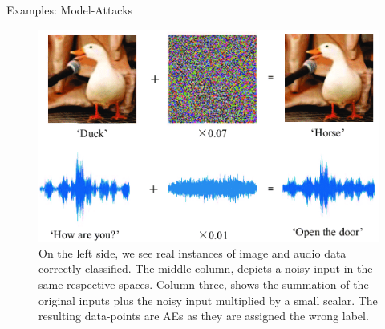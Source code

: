 \documentclass[11pt,compress,t,notes=noshow, xcolor=table]{beamer}
\begin{document}
\begin{vbframe}{Examples: Model-Attacks}
\begin{figure}[h]
\centering
  \includegraphics[width=0.6\linewidth]{slides/local-explanations/figure/AEduckSound.png}
  \caption{On the left side, we see real instances of image and audio data  correctly classified. The middle column, depicts a noisy-input in the same respective spaces. Column three, shows the summation of the original inputs plus the noisy input multiplied by a small scalar. The resulting data-points are AEs as they are assigned the wrong label.}
  \label{fig:mnist}
\end{figure} 


\end{vbframe}
\end{document}
